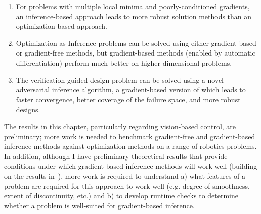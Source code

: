 \begin{enumerate}
    \item For problems with multiple local minima and poorly-conditioned gradients, an inference-based approach leads to more robust solution methods than an optimization-based approach.
    \item Optimization-as-Inference problems can be solved using either gradient-based or gradient-free methods, but gradient-based methods (enabled by automatic differentiation) perform much better on higher dimensional problems.
    \item The verification-guided design problem can be solved using a novel adversarial inference algorithm, a gradient-based version of which leads to faster convergence, better coverage of the failure space, and more robust designs.
\end{enumerate}

The results in this chapter, particularly regarding vision-based control, are preliminary; more work is needed to benchmark gradient-free and gradient-based inference methods against optimization methods on a range of robotics problems. In addition, although I have preliminary theoretical results that provide conditions under which gradient-based inference methods will work well (building on the results in~\cite{maSamplingCanBe2019}), more work is required to understand a) what features of a problem are required for this approach to work well (e.g. degree of smoothness, extent of discontinuity, etc.) and b) to develop runtime checks to determine whether a problem is well-suited for gradient-based inference.
